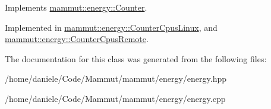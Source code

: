 Implements \hyperlink{classmammut_1_1energy_1_1Counter_aa31fb6f9fa1139a2fe3c41019801cefe}{mammut\-::energy\-::\-Counter}.



Implemented in \hyperlink{classmammut_1_1energy_1_1CounterCpusLinux_aa1ad68623ce7571a7570398c5488a65b}{mammut\-::energy\-::\-Counter\-Cpus\-Linux}, and \hyperlink{classmammut_1_1energy_1_1CounterCpusRemote_a20439f71fc4d024be5470cec09bd0355}{mammut\-::energy\-::\-Counter\-Cpus\-Remote}.



The documentation for this class was generated from the following files\-:\begin{DoxyCompactItemize}
\item 
/home/daniele/\-Code/\-Mammut/mammut/energy/energy.\-hpp\item 
/home/daniele/\-Code/\-Mammut/mammut/energy/energy.\-cpp\end{DoxyCompactItemize}
